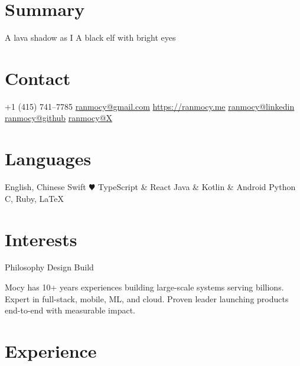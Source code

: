 \documentclass[]{friggeri-cv}
\begin{document}


\begin{aside} %
  \section{Summary}
  A lava shadow as I
  A black elf
  with bright eyes
  \section{Contact}
  +1 (415) 741--7785
  \href{mailto:ranmocy+cv@gmail.com}{ranmocy@gmail.com}
  \href{https://ranmocy.me}{https://ranmocy.me}
  \href{https://www.linkedin.com/in/ranmocy}{ranmocy@linkedin}
  \href{https://github.com/ranmocy}{ranmocy@github}
  \href{https://twitter.com/ranmocy}{ranmocy@X}
  \section{Languages}
  English, Chinese
  Swift {\color{red} $\varheartsuit$}
  TypeScript \& React
  Java \& Kotlin \& Android
  Python
  C, Ruby, LaTeX
  \section{Interests}
  Philosophy
  Design
  Build
\end{aside}


Mocy has 10+ years experiences building large-scale systems serving billions.
Expert in full-stack, mobile, ML, and cloud.
Proven leader launching products end-to-end with measurable impact.


\section{Experience}
\end{document}
